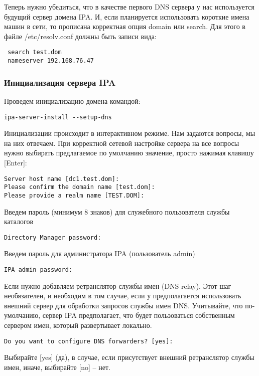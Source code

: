 \documentclass[a4paper,10pt,twoside]{article}
\begin{document}
Теперь нужно убедиться, что в качестве первого DNS сервера у нас используется будущий сервер домена IPA. И, если планируется использовать короткие имена машин в сети, то прописана корректная опция domain или search. Для этого в файле /etc/resolv.conf должны быть записи вида:
\begin{verbatim}
 search test.dom
 nameserver 192.168.76.47
 \end{verbatim} 
 
 \subsubsection{Инициализация сервера IPA}
 Проведем инициализацию домена командой:
 \begin{verbatim}
ipa-server-install --setup-dns
\end{verbatim}

Инициализации происходит в интерактивном режиме. Нам задаются вопросы, мы на них отвечаем. При корректной сетевой настройке сервера на все вопросы нужно выбирать предлагаемое по умолчанию значение, просто нажимая клавишу [Enter]:

\begin{verbatim}
Server host name [dc1.test.dom]:
Please confirm the domain name [test.dom]:
Please provide a realm name [TEST.DOM]:
\end{verbatim} 

Введем пароль (минимум 8 знаков) для служебного пользователя службы каталогов

\begin{verbatim}
Directory Manager password:
\end{verbatim}   

Введем пароль для администратора IPA (пользователь admin)

\begin{verbatim}
IPA admin password:
\end{verbatim} 

Если нужно добавляем ретранслятор службы имен (DNS relay). Этот шаг необязателен, и необходим в том случае, если у предполагается использовать внешний сервер для обработки запросов службы имен DNS. Учитывайте, что по-умолчанию, сервер IPA предполагает, что будет пользоваться собственным сервером имен, который развертывает локально.

\begin{verbatim}
Do you want to configure DNS forwarders? [yes]:
\end{verbatim} 

Выбирайте [yes] (да), в случае, если присутствует внешний ретранслятор службы имен, иначе, выбирайте [no] – нет.
\end{document}
